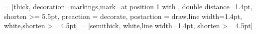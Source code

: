 \usetikzlibrary{automata,arrows,shapes,decorations,topaths,trees}

\pgfplotsset{compat=1.7} %



\usepackage{commath}
\newcommand{\parthead}[2]{%
\bigskip

\begin{center}
  \spacedallcaps{Part #1}\\\vspace{.3em}
  \spacedallcaps{#2}
\end{center}

\medskip
}




\usepackage{tikz-cd}
\usetikzlibrary{cd}
\newtheorem{theorem}{Theorem}
\newtheorem{definition}{Definition}



\usetikzlibrary{arrows, decorations.markings}
\usetikzlibrary{matrix}

 = [thick, decoration={markings,mark=at position
   1 with {}},
   double distance=1.4pt, shorten >= 5.5pt,
   preaction = {decorate},
   postaction = {draw,line width=1.4pt, white,shorten >= 4.5pt}]
 = [semithick, white,line width=1.4pt, shorten >= 4.5pt]

\newcommand*\ov[1]{\overline{#1}}
\newcommand*\un[1]{\underline{#1}}
\newcommand*\tre[1]{\trianglerighteq{#1}}

\newcommand{\A}{\mathcal{A}}
\newcommand{\B}{\mathcal{B}}
\newcommand{\C}{\mathcal{C}}
\newcommand{\D}{\mathcal{D}}
\newcommand{\E}{\mathcal{E}}
\newcommand{\F}{\mathcal{F}}
\newcommand{\G}{\mathcal{G}}
\newcommand{\I}{\mathcal{I}}
\newcommand{\calP}{\mathcal{P}}
\newcommand{\Q}{\mathcal{Q}}
\newcommand{\R}{\mathcal{R}}
\newcommand{\T}{\mathcal{T}}
\newcommand{\U}{\mathcal{U}}
\newcommand{\V}{\mathcal{V}}
\newcommand{\X}{\mathcal{X}}
\newcommand{\Y}{\mathcal{Y}}

\newcommand{\Exp}{\mathrm{Exp}}
\newcommand{\est}{\textit{est}}

\newcommand{\fraka}{\mathfrak{a}}
\newcommand{\frakg}{\mathfrak{g}}



